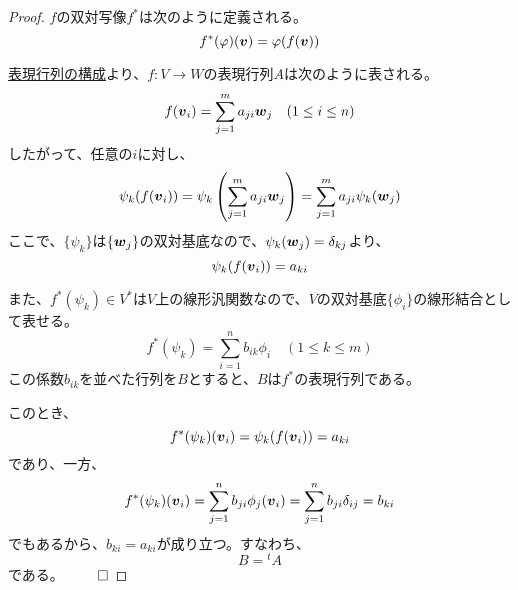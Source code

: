 \documentclass[../../../topic_linear-algebra]{subfiles}
\begin{document}
\begin{proof}
  $f$の双対写像$f^*$は次のように定義される。
  \begin{equation*}
    f^*(\varphi)(\vb*{v}) = \varphi(f(\vb*{v}))
  \end{equation*}
  
  \br
  
  \hyperref[sec:construction-of-matrix-rep]{表現行列の構成}より、$f \colon V \to W$の表現行列$A$は次のように表される。
  \begin{equation*}
    f(\vb*{v}_i) = \sum_{j=1}^m a_{ji} \vb*{w}_j \quad (1 \leq i \leq n)
  \end{equation*}
  したがって、任意の$i$に対し、
  \begin{equation*}
    \psi_k(f(\vb*{v}_i)) = \psi_k\left(\sum_{j=1}^m a_{ji} \vb*{w}_j\right) = \sum_{j=1}^m a_{ji} \psi_k(\vb*{w}_j)
  \end{equation*}
  ここで、$\{ \psi_k \}$は$\{ \vb*{w}_j \}$の双対基底なので、$\psi_k(\vb*{w}_j) = \delta_{kj}$より、
  \begin{equation*}
    \psi_k(f(\vb*{v}_i)) = a_{ki}
  \end{equation*}
  
  \br

  また、$f^*(\psi_k) \in V^*$は$V$上の線形汎関数なので、$V$の双対基底$\{ \phi_i \}$の線形結合として表せる。
  \begin{equation*}
    f^*(\psi_k) = \sum_{i=1}^n b_{ik} \phi_i \quad (1 \leq k \leq m)
  \end{equation*}
  この係数$b_{ik}$を並べた行列を$B$とすると、$B$は$f^*$の表現行列である。
  
  \br
  
  このとき、
  \begin{equation*}
    f^*(\psi_k)(\vb*{v}_i) = \psi_k(f(\vb*{v}_i)) = a_{ki}
  \end{equation*}
  であり、一方、
  \begin{equation*}
    f^*(\psi_k)(\vb*{v}_i) = \sum_{j=1}^n b_{ji} \phi_j(\vb*{v}_i) = \sum_{j=1}^n b_{ji} \delta_{ij} = b_{ki}
  \end{equation*}
  でもあるから、$b_{ki} = a_{ki}$が成り立つ。すなわち、
  \begin{equation*}
    B = {}^tA
  \end{equation*}
  である。 $\qed$
\end{proof}
\end{document}
